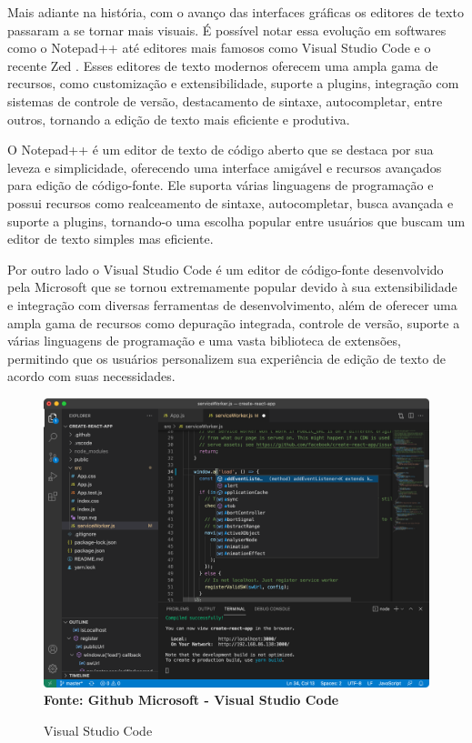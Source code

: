 Mais adiante na história, com o avanço das interfaces gráficas os editores de texto passaram a se tornar mais visuais. É possível notar essa evolução em
softwares como o Notepad++ \cite{NotepadPlusPlus2025} até editores mais famosos como Visual Studio Code \cite{VSCode2025} e o recente Zed
\cite{ZedEditor2025}. Esses editores de texto modernos oferecem uma ampla gama de recursos, como customização e extensibilidade, suporte a plugins,
integração com sistemas de controle de versão, destacamento de sintaxe, autocompletar, entre outros, tornando a edição de texto mais eficiente e produtiva.

O Notepad++ é um editor de texto de código aberto que se destaca por sua leveza e simplicidade, oferecendo uma interface amigável e recursos avançados
para edição de código-fonte. Ele suporta várias linguagens de programação e possui recursos como realceamento de sintaxe, autocompletar, busca avançada e
suporte a plugins, tornando-o uma escolha popular entre usuários que buscam um editor de texto simples mas eficiente.

Por outro lado o Visual Studio Code é um editor de código-fonte desenvolvido pela Microsoft que se tornou extremamente popular devido à sua extensibilidade e
integração com diversas ferramentas de desenvolvimento, além de oferecer uma ampla gama de recursos como depuração integrada, controle de versão, suporte a
várias linguagens de programação e uma vasta biblioteca de extensões, permitindo que os usuários personalizem sua experiência de edição de texto de acordo com
suas necessidades.

\FloatBarrier

\begin{figure}[!htbp]
	\centering
	\caption{Visual Studio Code}
	\includegraphics[scale=0.3]{imagens/VSCode}
	\\\textbf{Fonte: Github Microsoft - Visual Studio Code}
	\label{fig:VSCode}
\end{figure}
\FloatBarrier

